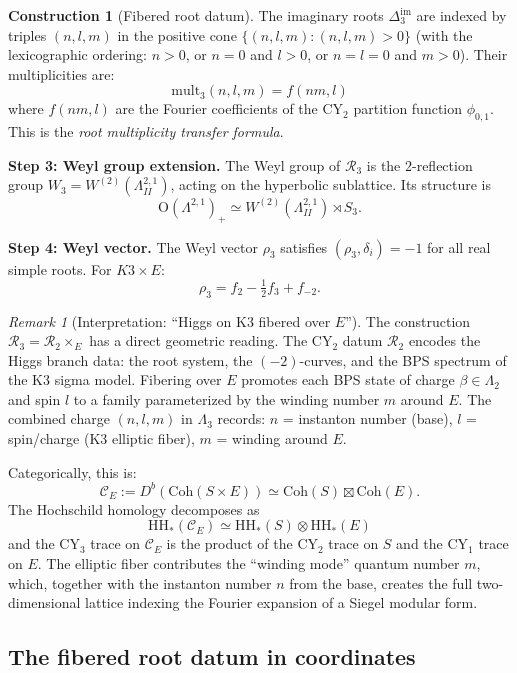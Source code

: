 \documentclass[11pt]{article}
\theoremstyle{plain}
\theoremstyle{definition}
\newtheorem{construction}[theorem]{Construction}
\theoremstyle{remark}
\newtheorem{remark}[theorem]{Remark}
\newcommand{\CY}{\mathrm{CY}}
\newcommand{\HH}{\mathrm{HH}}
\newcommand{\Coh}{\mathrm{Coh}}
\newcommand{\cC}{\mathcal{C}}
\newcommand{\cR}{\mathcal{R}}
\begin{document}
\begin{construction}[Fibered root datum]
The imaginary roots $\Delta_3^{\mathrm{im}}$ are indexed by triples $(n, l, m)$
in the positive cone $\{(n, l, m) : (n, l, m) > 0\}$ (with the lexicographic
ordering: $n > 0$, or $n = 0$ and $l > 0$, or $n = l = 0$ and $m > 0$).
Their multiplicities are:
\begin{equation}\label{eq:mult3-from-cy2}
 \mathrm{mult}_3(n, l, m) = f(nm, l)
\end{equation}
where $f(nm, l)$ are the Fourier coefficients of the $\CY_2$ partition function
$\phi_{0,1}$. This is the \emph{root multiplicity transfer formula}.

\medskip
\noindent\textbf{Step 3: Weyl group extension.} The Weyl group of $\cR_3$ is
the $2$-reflection group $W_3 = W^{(2)}(\Lambda^{2,1}_{II})$, acting on the
hyperbolic sublattice. Its structure is
\[
 \mathrm{O}(\Lambda^{2,1})_+ \simeq W^{(2)}(\Lambda^{2,1}_{II}) \rtimes S_3.
\]

\medskip
\noindent\textbf{Step 4: Weyl vector.} The Weyl vector $\rho_3$ satisfies
$(\rho_3, \delta_i) = -1$ for all real simple roots. For $K3 \times E$:
\[
 \rho_3 = f_2 - \tfrac{1}{2} f_3 + f_{-2}.
\]
\end{construction}

\begin{remark}[Interpretation: ``Higgs on K3 fibered over $E$'']
\label{rmk:higgs-on-k3}
The construction $\cR_3 = \cR_2 \times_E$ has a direct geometric reading.
The $\CY_2$ datum $\cR_2$ encodes the Higgs branch data: the root system, the $(-2)$-curves, and the BPS spectrum of the K3 sigma model. Fibering over $E$ promotes each BPS state of charge $\beta \in \Lambda_2$ and spin $l$ to a family parameterized by the winding number $m$ around $E$. The combined charge $(n, l, m)$ in $\Lambda_3$ records: $n$ = instanton number (base), $l$ = spin/charge (K3 elliptic fiber), $m$ = winding around $E$.

Categorically, this is:
\[
 \cC_E := D^b(\Coh(S \times E)) \simeq \Coh(S) \boxtimes \Coh(E).
\]
The Hochschild homology decomposes as
\[
 \HH_*(\cC_E) \simeq \HH_*(S) \otimes \HH_*(E)
\]
and the $\CY_3$ trace on $\cC_E$ is the product of the $\CY_2$ trace on $S$ and
the $\CY_1$ trace on $E$. The elliptic fiber contributes the ``winding mode''
quantum number $m$, which, together with the instanton number $n$ from the base,
creates the full two-dimensional lattice indexing the Fourier expansion of a
Siegel modular form.
\end{remark}

\subsection{The fibered root datum in coordinates}
\label{subsec:fibered-coordinates}
\end{document}

